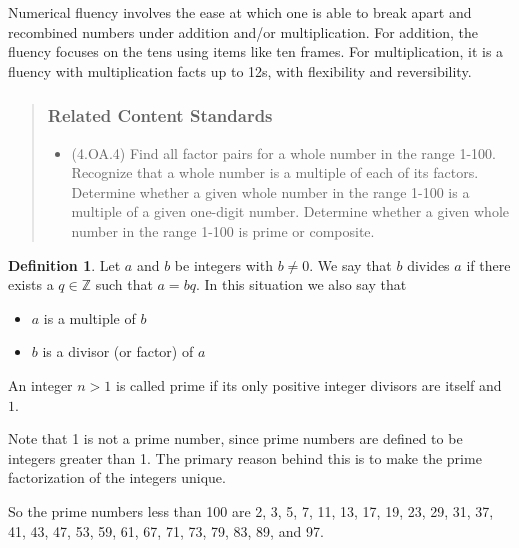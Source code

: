 \documentclass[
]{book}
\providecommand{\tightlist}{%
  \setlength{\itemsep}{0pt}\setlength{\parskip}{0pt}}
\theoremstyle{definition}
\newtheorem{definition}{Definition}[chapter]
\theoremstyle{definition}
\theoremstyle{definition}
\theoremstyle{remark}
\begin{document}
Numerical fluency involves the ease at which one is able to break apart and recombined numbers under addition and/or multiplication. For addition, the fluency focuses on the tens using items like ten frames. For multiplication, it is a fluency with multiplication facts up to 12s, with flexibility and reversibility.

\begin{quote}
\hypertarget{related-content-standards-29}{%
\subsubsection*{Related Content Standards}\label{related-content-standards-29}}

\begin{itemize}
\tightlist
\item
  (4.OA.4) Find all factor pairs for a whole number in the range 1-100. Recognize that a whole number is a multiple of each of its factors. Determine whether a given whole number in the range 1-100 is a multiple of a given one-digit number. Determine whether a given whole number in the range 1-100 is prime or composite.
\end{itemize}
\end{quote}

\begin{definition}
\protect\hypertarget{def:unnamed-chunk-179}{}{\label{def:unnamed-chunk-179} }Let \(a\) and \(b\) be integers with \(b\neq 0\). We say that \(b\) divides \(a\) if there exists a \(q\in \mathbb{Z}\) such that \(a=bq\). In this situation we also say that

\begin{itemize}
\item
  \(a\) is a multiple of \(b\)
\item
  \(b\) is a divisor (or factor) of \(a\)
\end{itemize}

An integer \(n>1\) is called prime if its only positive integer divisors are itself and \(1\).
\end{definition}

Note that 1 is not a prime number, since prime numbers are defined to be integers greater than 1. The primary reason behind this is to make the prime factorization of the integers unique.

So the prime numbers less than 100 are 2, 3, 5, 7, 11, 13, 17, 19, 23, 29, 31, 37, 41, 43, 47, 53, 59, 61, 67, 71, 73, 79, 83, 89, and 97.
\end{document}
